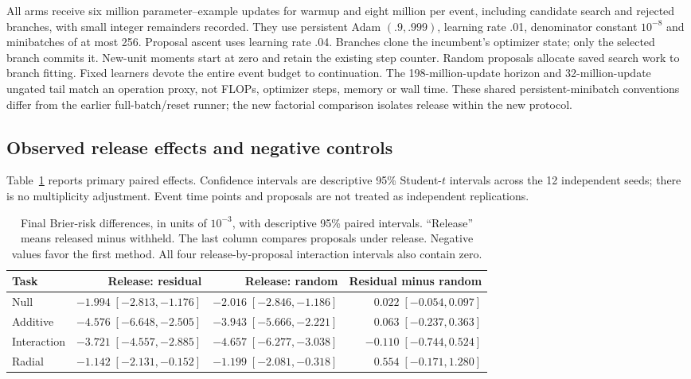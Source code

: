 All arms receive six million parameter--example updates for warmup and
eight million per event, including candidate search and rejected branches,
with small integer remainders recorded. They use persistent Adam
$(.9,.999)$, learning rate .01, denominator constant $10^{-8}$ and minibatches
of at most 256. Proposal ascent uses learning rate .04. Branches clone the
incumbent's optimizer state; only the selected branch commits it. New-unit
moments start at zero and retain the existing step counter. Random proposals
allocate saved search work to branch fitting. Fixed learners devote the
entire event budget to continuation. The 198-million-update horizon and
32-million-update ungated tail match an operation proxy, not FLOPs, optimizer
steps, memory or wall time. These shared persistent-minibatch conventions
differ from the earlier full-batch/reset runner; the new factorial comparison
isolates release within the new protocol.

\subsection{Observed release effects and negative controls}
Table~\ref{tab:release-effects} reports primary paired effects. Confidence
intervals are descriptive 95\% Student-$t$ intervals across the 12 independent
seeds; there is no multiplicity adjustment. Event time points and proposals
are not treated as independent replications.

\begin{table}[tb]
\centering\scriptsize
\begin{tabular}{lrrr}
\toprule
Task & Release: residual & Release: random & Residual minus random\\
\midrule
Null & $-1.994\;[-2.813,-1.176]$ & $-2.016\;[-2.846,-1.186]$ & $0.022\;[-0.054,0.097]$\\
Additive & $-4.576\;[-6.648,-2.505]$ & $-3.943\;[-5.666,-2.221]$ & $0.063\;[-0.237,0.363]$\\
Interaction & $-3.721\;[-4.557,-2.885]$ & $-4.657\;[-6.277,-3.038]$ & $-0.110\;[-0.744,0.524]$\\
Radial & $-1.142\;[-2.131,-0.152]$ & $-1.199\;[-2.081,-0.318]$ & $0.554\;[-0.171,1.280]$\\
\bottomrule
\end{tabular}
\caption{Final Brier-risk differences, in units of $10^{-3}$, with descriptive
95\% paired intervals. ``Release'' means released minus withheld. The last
column compares proposals under release. Negative values favor the first
method. All four release-by-proposal interaction intervals also contain zero.}
\label{tab:release-effects}
\end{table}

